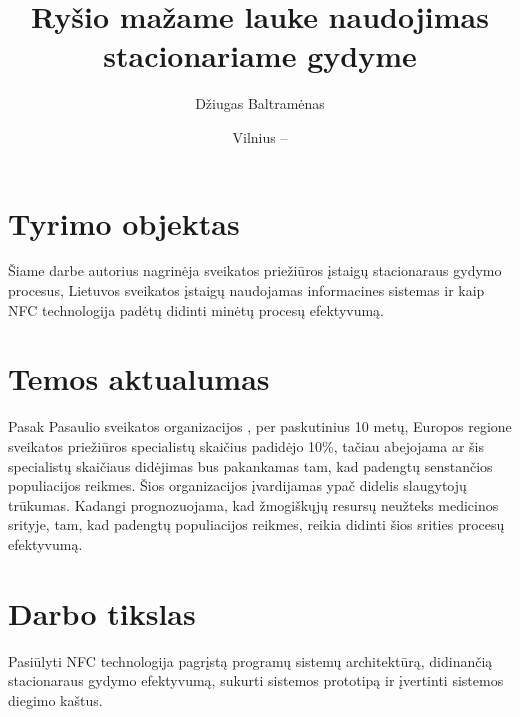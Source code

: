 \documentclass{VUMIFPSbakalaurinis}
\title{Ryšio mažame lauke naudojimas stacionariame gydyme}
\author{Džiugas Baltramėnas}
\date{Vilnius – \the\year}
\begin{document}
\maketitle

\tableofcontents

\section{Tyrimo objektas}
Šiame darbe autorius nagrinėja sveikatos priežiūros įstaigų stacionaraus gydymo procesus, Lietuvos sveikatos įstaigų naudojamas informacines sistemas ir kaip NFC technologija padėtų didinti minėtų procesų efektyvumą.


\section{Temos aktualumas}
Pasak Pasaulio sveikatos organizacijos \cite{Organization2012}, per paskutinius 10 metų, Europos regione sveikatos priežiūros specialistų skaičius padidėjo 10\%, tačiau abejojama ar šis specialistų skaičiaus didėjimas bus pakankamas tam, kad padengtų senstančios populiacijos reikmes. Šios organizacijos įvardijamas ypač didelis slaugytojų trūkumas. Kadangi prognozuojama, kad žmogiškųjų resursų neužteks medicinos srityje, tam, kad padengtų populiacijos reikmes, reikia didinti šios srities procesų efektyvumą.

\section{Darbo tikslas}
Pasiūlyti NFC technologija pagrįstą programų sistemų architektūrą, didinančią stacionaraus gydymo efektyvumą, sukurti sistemos prototipą ir įvertinti sistemos diegimo kaštus.
    
\end{document}
